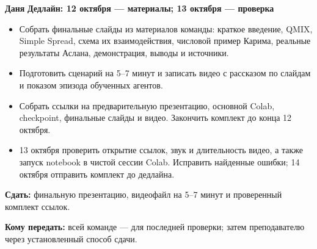 \documentclass[11pt,a4paper]{article}
\newcommand{\person}[2]{%
  \Needspace{12\baselineskip}
  \vspace{5pt}
  \noindent\colorbox{pale}{\parbox{\dimexpr\linewidth-2\fboxsep\relax}{%
    \hspace*{7pt}\rule{0pt}{25pt}{\Large\bfseries\color{navy}#1}%
    \hfill{\bfseries\color{deadline}Дедлайн: #2}\hspace*{7pt}}}\par
  \vspace{1pt}
}
\begin{document}
\person{Даня}{12 октября — материалы; 13 октября — проверка}
\begin{itemize}
  \item Собрать финальные слайды из материалов команды: краткое введение, QMIX, Simple Spread, схема их взаимодействия, числовой пример Карима, реальные результаты Аслана, демонстрация, выводы и источники.
  \item Подготовить сценарий на 5--7 минут и записать видео с рассказом по слайдам и показом эпизода обученных агентов.
  \item Собрать ссылки на предварительную презентацию, основной Colab, checkpoint, финальные слайды и видео. Закончить комплект до конца 12 октября.
  \item 13 октября проверить открытие ссылок, звук и длительность видео, а также запуск notebook в чистой сессии Colab. Исправить найденные ошибки; 14 октября отправить комплект до дедлайна.
\end{itemize}
\textbf{Сдать:} финальную презентацию, видеофайл на 5--7 минут и проверенный комплект ссылок.\par
\textbf{Кому передать:} всей команде — для последней проверки; затем преподавателю через установленный способ сдачи.\par
\end{document}
